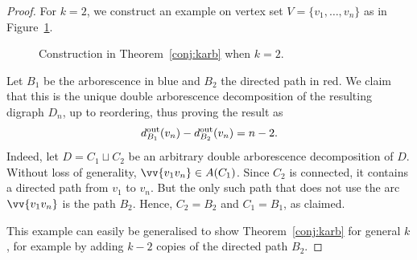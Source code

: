 \documentclass[11pt, reqno, a4paper]{article}
\theoremstyle{definition}
\numberwithin{equation}{section}
\begin{document}
\begin{proof}
For $k=2$, we construct an example on vertex set $V = \{ v_1,\dotsc, v_n\}$ as in Figure~\ref{fig:arbcounter}.

\begin{figure}[ht]
	\centering
	\caption{Construction in Theorem~\ref{conj:karb} when $k=2$.}
	\label{fig:arbcounter}
\end{figure}

Let $B_1$ be the arborescence in blue and $B_2$ the directed path in red.
We claim that this is the unique double arborescence decomposition of the resulting digraph $D_n$, up to reordering, thus proving the result as 
\begin{equation*}
d_{B_1}^{\textup{out}}(v_n) - d_{B_2}^{\textup{out}}(v_n) = n-2.
\end{equation*}
Indeed, let $D= C_1\sqcup C_2$ be an arbitrary double arborescence decomposition of $D$.
Without loss of generality, $ \vv{v_1v_n}\in A(C_1)$.
Since $C_2$ is connected, it contains a directed path from $v_1$ to $v_n$. 
But the only such path that does not use the arc $\vv{v_1v_n}$ is the path $B_2$.
Hence, $C_2= B_2$ and $C_1 = B_1$, as claimed.

This example can easily be generalised to show Theorem~\ref{conj:karb} for general $k$, for example by adding $k-2$ copies of the directed path $B_2$.
\end{proof}
\end{document}
